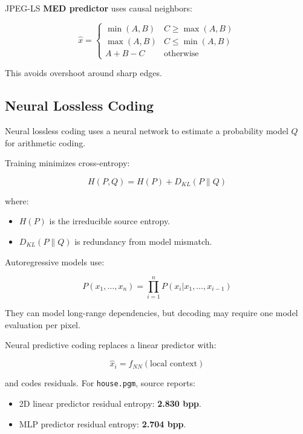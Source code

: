JPEG-LS \textbf{MED predictor} uses causal neighbors:

\begin{center}
\end{center}

\[
\hat{x}=
\begin{cases}
\min(A,B) & C\geq\max(A,B)\\
\max(A,B) & C\leq\min(A,B)\\
A+B-C & \text{otherwise}
\end{cases}
\]

This avoids overshoot around sharp edges.

\subsection{Neural Lossless Coding}

Neural lossless coding uses a neural network to estimate a probability model $Q$ for arithmetic coding.

Training minimizes cross-entropy:

\[
H(P,Q)=H(P)+D_{KL}(P\parallel Q)
\]

where:

\begin{itemize}
  \item $H(P)$ is the irreducible source entropy.
  \item $D_{KL}(P\parallel Q)$ is redundancy from model mismatch.
\end{itemize}

Autoregressive models use:

\[
P(x_1,\ldots,x_n)=\prod_{i=1}^{n}P(x_i|x_1,\ldots,x_{i-1})
\]

They can model long-range dependencies, but decoding may require one model evaluation per pixel.

Neural predictive coding replaces a linear predictor with:

\[
\hat{x}_i=f_{NN}(\text{local context})
\]

and codes residuals. For \texttt{house.pgm}, source reports:

\begin{itemize}
  \item 2D linear predictor residual entropy: \textbf{2.830 bpp}.
  \item MLP predictor residual entropy: \textbf{2.704 bpp}.
\end{itemize}

